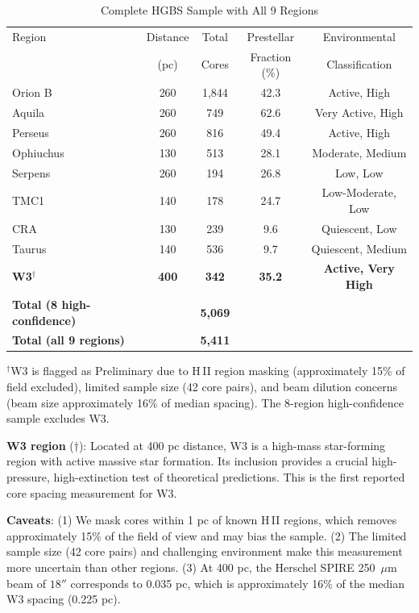 \documentclass[11pt,a4paper]{article}
\begin{document}
\begin{table}[H]
\centering
\caption{Complete HGBS Sample with All 9 Regions}
\label{tab:sample_overview}
\begin{tabular}{lcccc}
\toprule
Region & Distance & Total & Prestellar & Environmental \\
       & (pc)   & Cores & Fraction (\%) & Classification \\
\midrule
Orion B  & 260     & 1,844 & 42.3     & Active, High \\
Aquila   & 260     & 749   & 62.6     & Very Active, High \\
Perseus  & 260     & 816   & 49.4     & Active, High \\
Ophiuchus& 130     & 513   & 28.1     & Moderate, Medium \\
Serpens  & 260     & 194   & 26.8     & Low, Low \\
TMC1     & 140     & 178   & 24.7     & Low-Moderate, Low \\
CRA      & 130     & 239   & 9.6      & Quiescent, Low \\
Taurus   & 140     & 536   & 9.7      & Quiescent, Medium \\
\textbf{W3}$^{\dagger}$      & \textbf{400}     & \textbf{342}   & \textbf{35.2}     & \textbf{Active, Very High} \\
\midrule
\textbf{Total (8 high-confidence)} &        & \textbf{5,069} &        &  \\
\textbf{Total (all 9 regions)} &        & \textbf{5,411} &        &  \\
\bottomrule
\end{tabular}
\vspace{-0.5em}
\small{$^{\dagger}$W3 is flagged as Preliminary due to H\,{\scriptsize II} region masking (approximately 15\% of field excluded), limited sample size (42 core pairs), and beam dilution concerns (beam size approximately 16\% of median spacing). The 8-region high-confidence sample excludes W3.}
\end{table}

\noindent\textbf{W3 region} ($\dagger$): Located at 400 pc distance, W3 is a high-mass star-forming region with active massive star formation. Its inclusion provides a crucial high-pressure, high-extinction test of theoretical predictions. This is the first reported core spacing measurement for W3.

\textbf{Caveats}: (1) We mask cores within 1 pc of known H\,{\scriptsize II} regions, which removes approximately 15\% of the field of view and may bias the sample. (2) The limited sample size (42 core pairs) and challenging environment make this measurement more uncertain than other regions. (3) At 400 pc, the Herschel SPIRE 250~$\mu$m beam of $18''$ corresponds to 0.035 pc, which is approximately 16\% of the median W3 spacing (0.225 pc).
\end{document}
